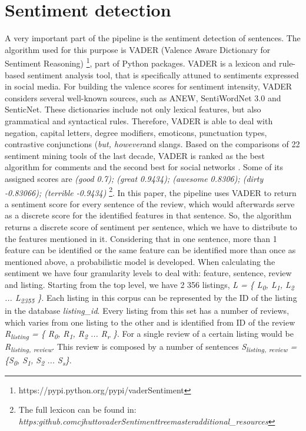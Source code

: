 \section{Sentiment detection}
A very important part of the pipeline is the sentiment detection of sentences. The algorithm used for this purpose is VADER (Valence Aware Dictionary for Sentiment Reasoning) \footnote{https://pypi.python.org/pypi/vaderSentiment}, part of Python packages. VADER is a lexicon and rule-based sentiment analysis tool, that is specifically attuned to sentiments expressed in social media. For building the valence scores for sentiment intensity, VADER considers several well-known sources, such as ANEW, SentiWordNet 3.0 and SenticNet. These dictionaries include not only lexical features, but also grammatical and syntactical rules.
Therefore, VADER is able to deal with negation, capital letters, degree modifiers, emoticons, punctuation types, contrastive conjunctions (\textit{but, however}and slangs.  Based on the comparisons of 22 sentiment mining tools of the last decade, VADER is ranked as the best algorithm for comments and the second best for social networks \cite{ribeiro2015benchmark}. Some of its assigned scores are \textit{(good 0.7); (great 0.9434); (awesome	0.8306); (dirty -0.83066); (terrible -0.9434)} \footnote{The full lexicon can be found in: \textit{https:\/\/github.com\/cjhutto\/vaderSentiment\/tree\/master\/additional\_resources}}. In this paper, the pipeline uses VADER to return a sentiment score for every sentence of the review, which would afterwards serve as a discrete score for the identified features in that sentence. So, the algorithm returns a discrete score of sentiment per sentence, which we have to distribute to the features mentioned in it. Considering that in one sentence, more than 1 feature can be identified or the same feature can be identified more than once as mentioned above, a probabilistic model is developed. When calculating the sentiment we have four granularity levels to deal with: feature, sentence, review and listing. Starting from the top level, we have 2 356 listings, \textit{L = \{ L\textsubscript{0}, L\textsubscript{1},  L\textsubscript{2} ... L\textsubscript{2355} \}}. Each listing in this corpus can be represented by the ID of the listing in the database \textit{listing\_id}. Every listing from this set has a number of reviews, which varies from one listing to the other and is identified from ID of the review \textit{R\textsubscript{listing} = \{ R\textsubscript{0}, R\textsubscript{1},  R\textsubscript{2} ... R\textsubscript{r} \}}. For a single review of a certain listing would be \textit{R\textsubscript{listing, review}}. This review is composed by a number of sentences \textit{S\textsubscript{listing, review} = \{S\textsubscript{0}, S\textsubscript{1}, S\textsubscript{2} ... S\textsubscript{s}\}}. 
